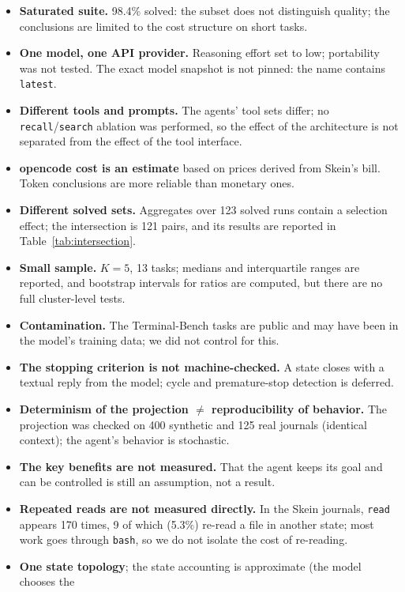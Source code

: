 \documentclass[11pt,a4paper]{article}
\begin{document}
\begin{itemize}[leftmargin=1.4em,itemsep=0.2em]
  \item \textbf{Saturated suite.} 98.4\% solved: the subset does not distinguish quality; the
  conclusions are limited to the cost structure on short tasks.
  \item \textbf{One model, one API provider.} Reasoning effort set to low; portability was not tested.
  The exact model snapshot is not pinned: the name contains \texttt{latest}.
  \item \textbf{Different tools and prompts.} The agents' tool sets differ; no
  \texttt{recall}/\texttt{search} ablation was performed, so the effect of the architecture is
  not separated from the effect of the tool interface.
  \item \textbf{opencode cost is an estimate} based on prices derived from Skein's bill. Token
  conclusions are more reliable than monetary ones.
  \item \textbf{Different solved sets.} Aggregates over 123 solved runs contain a selection
  effect; the intersection is 121 pairs, and its results are reported in
  Table~\ref{tab:intersection}.
  \item \textbf{Small sample.} $K=5$, 13 tasks; medians and interquartile ranges are reported,
  and bootstrap intervals for ratios are computed, but there are no full cluster-level tests.
  \item \textbf{Contamination.} The Terminal-Bench tasks are public and may have been in the
  model's training data; we did not control for this.
  \item \textbf{The stopping criterion is not machine-checked.} A state closes with a
  textual reply from the model; cycle and premature-stop detection is deferred.
  \item \textbf{Determinism of the projection $\neq$ reproducibility of behavior.} The projection
  was checked on 400 synthetic and 125 real journals (identical context); the agent's behavior
  is stochastic.
  \item \textbf{The key benefits are not measured.} That the agent keeps its goal and can be
  controlled is still an assumption, not a result.
  \item \textbf{Repeated reads are not measured directly.} In the Skein journals,
  \texttt{read} appears 170 times, 9 of which (5.3\%) re-read a file in another state; most work
  goes through \texttt{bash}, so we do not isolate the cost of re-reading.
  \item \textbf{One state topology}; the state accounting is approximate (the model chooses the

\end{itemize}
\end{document}
